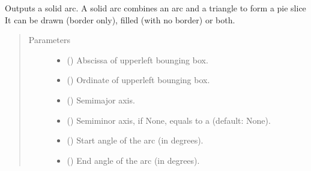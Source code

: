 \documentclass[letterpaper,10pt,english]{sphinxmanual}
\begin{document}
\begin{fulllineitems}
\begin{fulllineitems}
\label{\detokenize{generated/quality_assessment.quality_pdf_report.DefectReportPDF.solid_arc:quality_assessment.quality_pdf_report.DefectReportPDF.solid_arc}}
\sphinxAtStartPar
Outputs a solid arc. A solid arc combines an arc and a triangle to form a pie slice
It can be drawn (border only), filled (with no border) or both.
\begin{quote}\begin{description}
\item[{Parameters}] \leavevmode\begin{itemize}
\item {} 
\sphinxAtStartPar
{} () \textendash{} Abscissa of upper\sphinxhyphen{}left bounging box.

\item {} 
\sphinxAtStartPar
{} () \textendash{} Ordinate of upper\sphinxhyphen{}left bounging box.

\item {} 
\sphinxAtStartPar
{} () \textendash{} Semi\sphinxhyphen{}major axis.

\item {} 
\sphinxAtStartPar
{} () \textendash{} Semi\sphinxhyphen{}minor axis, if None, equals to a (default: None).

\item {} 
\sphinxAtStartPar
{} () \textendash{} Start angle of the arc (in degrees).

\item {} 
\sphinxAtStartPar
{} () \textendash{} End angle of the arc (in degrees).


\end{itemize}
\end{description}
\end{quote}
\end{fulllineitems}
\end{fulllineitems}
\end{document}
